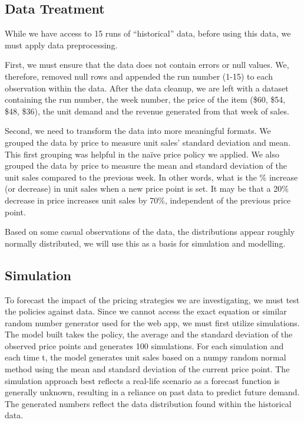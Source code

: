 \documentclass[11pt,a4paper]{article}
\begin{document}
\subsection{Data Treatment}
While we have access to 15 runs of “historical” data, before using this data, we must apply data preprocessing. 

First, we must ensure that the data does not contain errors or null values. 
We, therefore, removed null rows and appended the run number (1-15) to each observation within the data. 
After the data cleanup, we are left with a dataset containing the run number, the week number, the price of the item (\$60, \$54, \$48, \$36), the unit demand and the revenue generated from that week of sales. 

Second, we need to transform the data into more meaningful formats. 
We grouped the data by price to measure unit sales’ standard deviation and mean. 
This first grouping was helpful in the naïve price policy we applied. 
We also grouped the data by price to measure the mean and standard deviation of the unit sales compared to the previous week. 
In other words, what is the \% increase (or decrease) in unit sales when a new price point is set. It may be that a 20\% decrease in price increases unit sales by 70\%, independent of the previous price point. 

Based on some casual observations of the data, the distributions appear roughly normally distributed, we will use this as a basis for simulation and modelling. 

\subsection{Simulation}
To forecast the impact of the pricing strategies we are investigating, we must test the policies against data. 
Since we cannot access the exact equation or similar random number generator used for the web app, we must first utilize simulations. 
The model built takes the policy, the average and the standard deviation of the observed price points and generates 100 simulations. 
For each simulation and each time t, the model generates unit sales based on a numpy random normal method using the mean and standard deviation of the current price point. 
The simulation approach best reflects a real-life scenario as a forecast function is generally unknown, resulting in a reliance on past data to predict future demand. 
The generated numbers reflect the data distribution found within the historical data. \\
\end{document}
